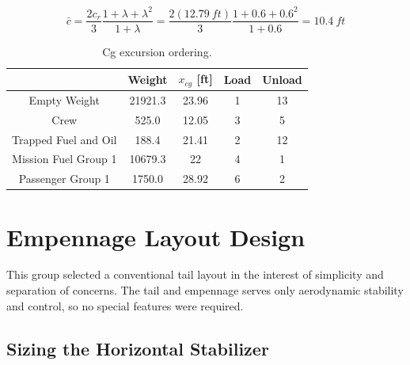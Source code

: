 \documentclass[conf]{new-aiaa}
\begin{document}
\begin{equation*}
\bar{c}=\frac{2c_r}{3}\frac{1+\lambda+\lambda^2}{1+\lambda}=\frac{2(12.79\ ft)}{3}\frac{1+0.6+0.6^2}{1+0.6}=10.4\ ft
\end{equation*}



\begin{table}
\centering
\label{tab:Cg excursion ordering}
\caption{Cg excursion ordering.}
\begin{tabular}{|c|c|c|c|c|}\hline
			& Weight 	& $x_{cg}$ [ft] & Load & Unload \\ \hline
Empty Weight & 21921.3 & 23.96 & 1 & 13 \\ \hline
Crew & 525.0 & 12.05 & 3 & 5 \\ \hline
Trapped Fuel and Oil & 188.4 & 21.41 & 2 & 12 \\ \hline
Mission Fuel Group 1 & 10679.3 & 22 & 4 & 1 \\ \hline
Passenger Group 1 & 1750.0 & 28.92 & 6 & 2 \\ \hline

\end{tabular}
\end{table}

\section{Empennage Layout Design}

This group selected a conventional tail layout in the interest of simplicity and separation of concerns. The tail and empennage serves only aerodynamic stability and control, so no special features were required.

\subsection{Sizing the Horizontal Stabilizer} %
\end{document}
